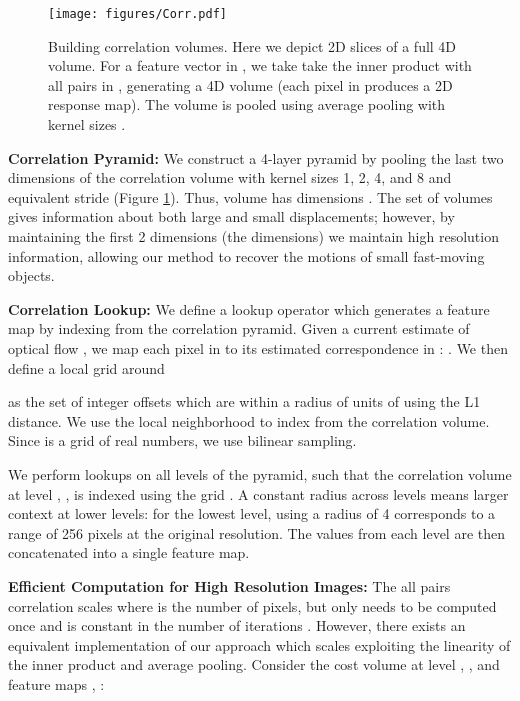 \documentclass[runningheads]{llncs}
\begin{document}
\begin{figure}[t]
    \centering
	\texttt{[image: figures/Corr.pdf]}
	\caption{Building correlation volumes. Here we depict 2D slices of a full 4D volume. For a feature vector in , we take take the inner product with all pairs in , generating a 4D  volume (each pixel in  produces a 2D response map). The volume is pooled using average pooling with kernel sizes .}
	\label{fig:CorrPyramid}
\end{figure}

\noindent \textbf{Correlation Pyramid:} We construct a 4-layer pyramid  by pooling the last two dimensions of the correlation volume with kernel sizes 1, 2, 4, and 8 and equivalent stride (Figure \ref{fig:CorrPyramid}). Thus, volume  has dimensions . The set of volumes gives information about both large and small displacements;  however, by maintaining the first 2 dimensions (the  dimensions) we maintain high resolution information, allowing our method to recover the motions of small fast-moving objects.

\smallskip \noindent \textbf{Correlation Lookup: } We define a lookup operator  which generates a feature map by indexing from the correlation pyramid. Given a current estimate of optical flow , we map each pixel  in  to its estimated correspondence in : . We then define a local grid around 

as the set of integer offsets which are within a radius of  units of  using the L1 distance. We use the local neighborhood  to index from the correlation volume. Since  is a grid of real numbers, we use bilinear sampling. 

We perform lookups on all levels of the pyramid, such that the correlation volume at level , , is indexed using the grid . A constant radius across levels means larger context at lower levels: for the lowest level,  using a radius of 4 corresponds to a range of 256 pixels at the original resolution. The values from each level are then concatenated into a single feature map.



\smallskip\noindent \textbf{Efficient Computation for High Resolution Images: } The all pairs correlation scales  where  is the number of pixels, but only needs to be computed once and is constant in the number of iterations . However, there exists an equivalent implementation of our approach which scales  exploiting the linearity of the inner product and  average pooling. Consider the cost volume at level , , and feature maps , :
\end{document}
